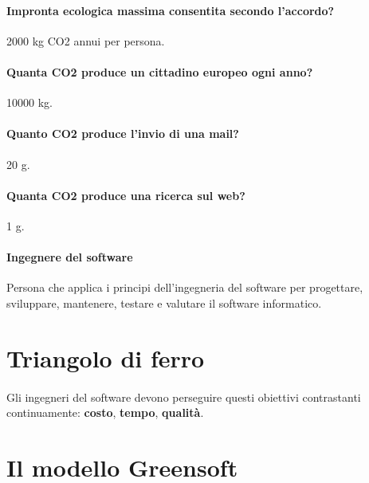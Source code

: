 \documentclass[a4paper, 12pt]{report}
\begin{document}
          \paragraph{Impronta ecologica massima consentita secondo l’accordo?} 2000 kg CO2 annui per persona.
          \paragraph{Quanta CO2 produce un cittadino europeo ogni anno?} 10000 kg.
          \paragraph{Quanto CO2 produce l’invio di una mail?} 20 g.
          \paragraph{Quanta CO2 produce una ricerca sul web?} 1 g.
          \paragraph{Ingegnere del software} Persona che applica i principi dell'ingegneria del software per progettare, sviluppare, mantenere,
          testare e valutare il software informatico.
          \section{Triangolo di ferro}
          \paragraph{}Gli ingegneri del software devono perseguire questi obiettivi contrastanti continuamente: \textbf{costo}, \textbf{tempo}, \textbf{qualità}.
          \section{Il modello Greensoft}
\end{document}
